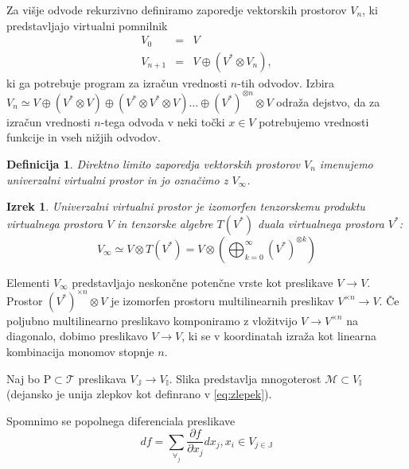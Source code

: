 \documentclass{article}
\newcommand{\II}{\mathbb{I}}
\newcommand{\JJ}{\mathbb{J}}
\newcommand{\T}{\mathcal{T}}
\newtheorem{definicija}{Definicija}[section]
\newtheorem{izrek}{Izrek}[section]
\begin{document}
Za višje odvode rekurzivno definiramo zaporedje vektorskih prostorov $V_n$, ki
predstavljajo virtualni pomnilnik
\begin{eqnarray}\label{eq:V_n}
  \label{eq:prapor}
  V_0 &=& V\\
  V_{n+1}&=&V\oplus (V^*\otimes V_n),
\end{eqnarray} 
ki ga potrebuje program za izračun vrednosti $n$-tih odvodov. Izbira $V_n\simeq
V\oplus (V^*\otimes V) \oplus (V^*\otimes V^*\otimes V) \ldots \oplus
(V^*)^{\otimes n}\otimes V$ odraža dejstvo, da za izračun vrednosti $n$-tega odvoda v neki točki $x\in V$
potrebujemo vrednosti funkcije in vseh nižjih odvodov.
\begin{definicija}
  Direktno limito zaporedja vektorskih prostorov $V_n$ imenujemo
  \emph{univerzalni virtualni prostor} in jo označimo z $V_\infty$.
\end{definicija}
\begin{izrek}
  Univerzalni virtualni prostor je izomorfen tenzorskemu produktu virtualnega
  prostora $V$ in tenzorske algebre $T(V^*)$ duala virtualnega prostora $V^*$:
  \begin{equation}
\label{eq:tenzor_algebra}
    V_\infty\simeq V\otimes T(V^*) = V \otimes\left(\bigoplus_{k=0}^\infty (V^*)^{\otimes k} \right)
\end{equation}

\end{izrek}

Elementi $V_\infty$ predstavljajo neskončne potenčne vrste kot preslikave 
$V\to V$. Prostor $(V^*)^{\times n}\otimes V$ je izomorfen prostoru
multilinearnih preslikav $V^{\times n}\to V$. Če poljubno
multilinearno preslikavo komponiramo z vložitvijo $V\to V^{\times n}$ na
diagonalo, dobimo preslikavo $V\to V$, ki se v koordinatah izraža kot linearna
kombinacija monomov stopnje $n$.
   
Naj bo $\mathrm{P}\subset\T$ preslikava $V_\JJ\to V_\II$. Slika predstavlja
mnogoterost $\mathcal{M}\subset V_\II$ (dejansko je unija zlepkov kot definrano
v \ref{eq:zlepek}).


Spomnimo se popolnega diferenciala preslikave
$$df=\sum_{\forall_j}\frac{\partial f}{\partial x_j}dx_j, x_i\in V_{j\in\JJ}$$

\end{document}
